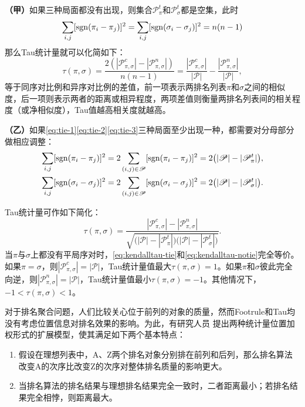 \textbf{（甲）}如果三种局面都没有出现，则集合$\mathscr P_\pi^t$和$\mathscr P_\sigma^t$都是空集，此时
\[
    \sum\limits_{i,j} [\operatorname{\mathrm{sgn}}(\pi_i - \pi_j)]^2 = \sum\limits_{i,j} [\operatorname{\mathrm{sgn}}(\sigma_i - \sigma_j)]^2 = n(n-1)
\]
那么Tau统计量就可以化简如下：
\begin{equation}\label{eq:kendalltau-notie}
    \tau(\pi,\sigma) = \frac{2(|\mathscr P_{\pi,\sigma}^c| - |\mathscr P_{\pi,\sigma}^n|)}{n(n-1)} = \frac{|\mathscr P_{\pi,\sigma}^c|}{|\mathscr P|} - \frac{|\mathscr P_{\pi,\sigma}^n|}{|\mathscr P|},
\end{equation}
等于同序对比例和异序对比例的差值，前一项表示两排名列表$\pi$和$\sigma$之间的相似度，后一项则表示两者的距离或相异程度，两项差值则衡量两排名列表间的相关程度（或净相似度），Tau值越高相关度就越高。

\textbf{（乙）}如果\eqref{eq:tie-1}\eqref{eq:tie-2}\eqref{eq:tie-3}三种局面至少出现一种，都需要对分母部分做相应调整：
\begin{eqnarray}
  \sum\limits_{i,j} [\operatorname{\mathrm{sgn}}(\pi_i - \pi_j)]^2 = 2 \sum\limits_{(i,j)\in \mathscr P} [\operatorname{\mathrm{sgn}}(\pi_i - \pi_j)]^2 = 2 \big(|\mathscr P| - |\mathscr P^t_\pi|\big), \\
  \sum\limits_{i,j} [\operatorname{\mathrm{sgn}}(\sigma_i - \sigma_j)]^2 = 2 \sum\limits_{(i,j)\in \mathscr P} [\operatorname{\mathrm{sgn}}(\sigma_i - \sigma_j)]^2 = 2 \big(|\mathscr P| - |\mathscr P^t_\sigma|\big).
\end{eqnarray}

Tau统计量可作如下简化：
\begin{equation}\label{eq:kendalltau-tie}
    \tau(\pi,\sigma) = \frac{|\mathscr P_{\pi,\sigma}^c| - |\mathscr P_{\pi,\sigma}^n|}{\sqrt{\big(|\mathscr P| - |\mathscr P^t_\pi|\big)\big(|\mathscr P| - |\mathscr P^t_\sigma|\big)}}.
\end{equation}
当$\pi$与$\sigma$上都没有平局序对时，\eqref{eq:kendalltau-tie}和\eqref{eq:kendalltau-notie}完全等价。如果$\pi=\sigma$，则$|\mathscr P_{\pi,\sigma}^c| = |\mathscr P|$，Tau统计量值最大$\tau(\pi,\sigma)=1$。如果$\pi$和$\sigma$彼此完全向逆，则$|\mathscr P_{\pi,\sigma}^n| = |\mathscr P|$，Tau统计量值最小$\tau(\pi,\sigma)=-1$。其他情况下，$-1 < \tau(\pi,\sigma) < 1$。

对于排名聚合问题，人们比较关心位于前列的对象的质量，然而Footrule和Tau均没有考虑位置信息对排名效果的影响。为此，有研究人员
\cite{kumar2010generalized,farnoud2012novel}提出两种统计量位置加权形式的扩展模型，使其满足如下两个基本特点：
\begin{enumerate}
  \item 假设在理想列表中，A、Z两个排名对象分别排在前列和后列，那么排名算法改变A的次序比改变Z的次序对整体排名质量的影响更大。
  \item 当排名算法的排名结果与理想排名结果完全一致时，二者距离最小；若排名结果完全相悖，则距离最大。
\end{enumerate}

